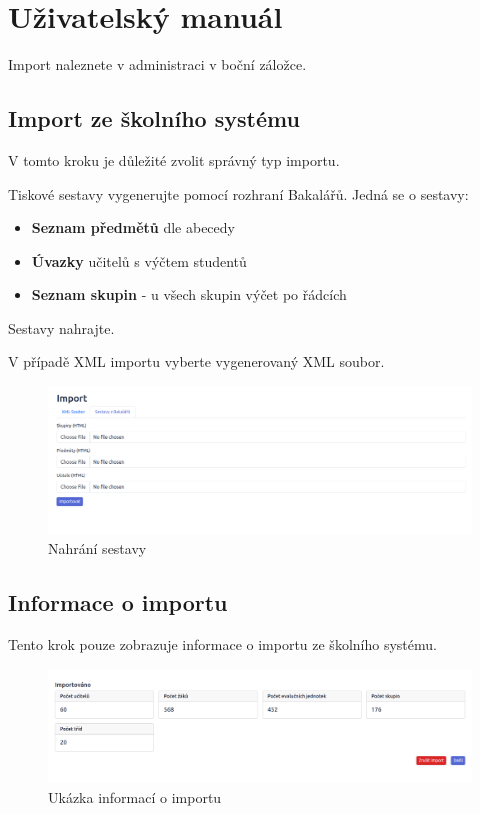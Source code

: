%
%
%
%
%
%
% 
%

\chapter{Uživatelský manuál}

Import naleznete v administraci v boční záložce. 


\section{Import ze školního systému}
V tomto kroku je důležité zvolit správný typ importu.

Tiskové sestavy vygenerujte pomocí rozhraní Bakalářů. Jedná se o sestavy:
\begin{itemize}
    \item \textbf{Seznam předmětů} dle abecedy
    \item \textbf{Úvazky} učitelů s výčtem studentů
    \item \textbf{Seznam skupin} - u všech skupin výčet po řádcích
\end{itemize}
Sestavy nahrajte.

V případě XML importu vyberte vygenerovaný XML soubor.
\begin{figure}[H]
    \centering
    \includegraphics[width=1\linewidth]{Figures/uvodni_import.png}
    \caption{Nahrání sestavy}
    \label{fig:uvodni-import}
\end{figure}
\newpage
\section{Informace o importu}
Tento krok pouze zobrazuje informace o importu ze školního systému.
\begin{figure}[H]
    \centering
    \includegraphics[width=1\linewidth]{Figures/statistika.png}
    \caption{Ukázka informací o importu}
    \label{fig:informace}
\end{figure}

